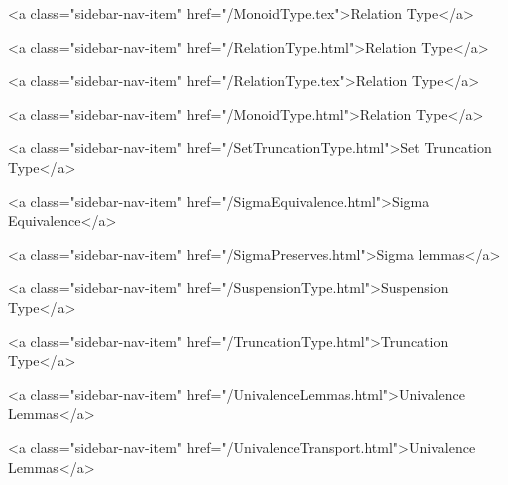      
    
      
        
          <a class="sidebar-nav-item" href="/MonoidType.tex">Relation Type</a>
        
      
    
      
        
          <a class="sidebar-nav-item" href="/RelationType.html">Relation Type</a>
        
      
    
      
        
          <a class="sidebar-nav-item" href="/RelationType.tex">Relation Type</a>
        
      
    
      
        
          <a class="sidebar-nav-item" href="/MonoidType.html">Relation Type</a>
        
      
    
      
        
          <a class="sidebar-nav-item" href="/SetTruncationType.html">Set Truncation Type</a>
        
      
    
      
        
          <a class="sidebar-nav-item" href="/SigmaEquivalence.html">Sigma Equivalence</a>
        
      
    
      
        
          <a class="sidebar-nav-item" href="/SigmaPreserves.html">Sigma lemmas</a>
        
      
    
      
        
          <a class="sidebar-nav-item" href="/SuspensionType.html">Suspension Type</a>
        
      
    
      
        
          <a class="sidebar-nav-item" href="/TruncationType.html">Truncation Type</a>
        
      
    
      
        
          <a class="sidebar-nav-item" href="/UnivalenceLemmas.html">Univalence Lemmas</a>
        
      
    
      
        
          <a class="sidebar-nav-item" href="/UnivalenceTransport.html">Univalence Lemmas</a>
        
